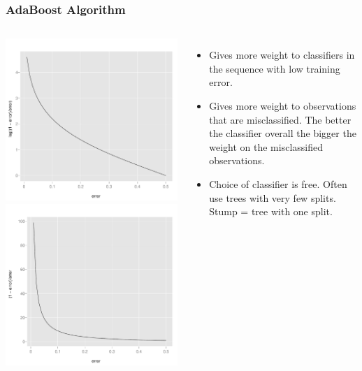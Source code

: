 \documentclass{beamer}
\begin{document}
\begin{frame}
\frametitle{AdaBoost Algorithm}
\begin{columns}[c] 
		\includegraphics{log.pdf}\\
		\includegraphics{exp.pdf}
	\begin{itemize}
		\item Gives more weight to classifiers in the sequence with low training error.	
		\item Gives more weight to observations that are misclassified.  The better the classifier overall the bigger the weight on the misclassified observations.
		\item Choice of classifier is free. Often use trees with very few splits.  Stump = tree with one split.
	\end{itemize}
	\end{columns}
\end{frame}
\end{document}

